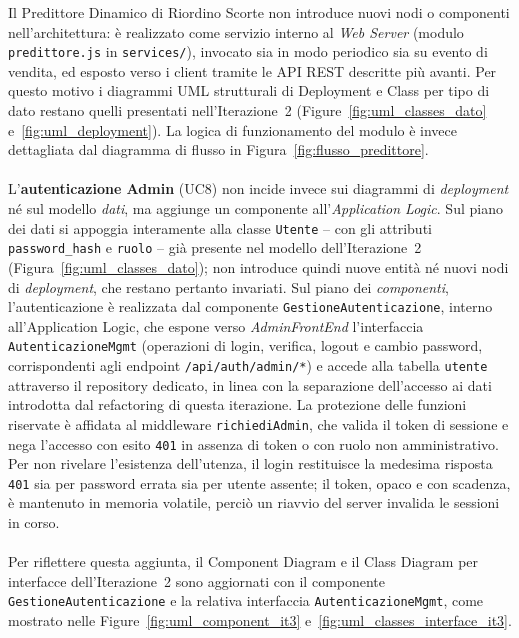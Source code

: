 Il Predittore Dinamico di Riordino Scorte non introduce nuovi nodi o componenti
nell'architettura: è realizzato come servizio interno al \textit{Web Server}
(modulo \texttt{predittore.js} in \texttt{services/}), invocato sia in modo
periodico sia su evento di vendita, ed esposto verso i client tramite le API REST
descritte più avanti. Per questo motivo i diagrammi UML strutturali di
Deployment e Class per tipo di dato restano quelli presentati nell'Iterazione~2
(Figure~\ref{fig:uml_classes_dato} e~\ref{fig:uml_deployment}). La logica di
funzionamento del modulo è invece dettagliata dal diagramma di flusso in
Figura~\ref{fig:flusso_predittore}.
\\ \\
L'\textbf{autenticazione Admin} (UC8) non incide invece sui diagrammi di
\emph{deployment} né sul modello \emph{dati}, ma aggiunge un componente
all'\textit{Application Logic}. Sul piano dei dati si appoggia interamente alla
classe \texttt{Utente} -- con gli attributi \texttt{password\_hash} e
\texttt{ruolo} -- già presente nel modello dell'Iterazione~2
(Figura~\ref{fig:uml_classes_dato}); non introduce quindi nuove entità né nuovi
nodi di \emph{deployment}, che restano pertanto invariati. Sul piano dei
\emph{componenti}, l'autenticazione è realizzata dal componente
\texttt{GestioneAutenticazione}, interno all'Application Logic, che espone verso
\textit{AdminFrontEnd} l'interfaccia \texttt{AutenticazioneMgmt} (operazioni di
login, verifica, logout e cambio password, corrispondenti agli endpoint
\texttt{/api/auth/admin/*}) e accede alla tabella \texttt{utente} attraverso il
repository dedicato, in linea con la separazione dell'accesso ai dati introdotta
dal refactoring di questa iterazione. La protezione delle funzioni riservate è
affidata al middleware \texttt{richiediAdmin}, che valida il token di sessione e
nega l'accesso con esito \texttt{401} in assenza di token o con ruolo non
amministrativo. Per non rivelare l'esistenza dell'utenza, il login restituisce la
medesima risposta \texttt{401} sia per password errata sia per utente assente; il
token, opaco e con scadenza, è mantenuto in memoria volatile, perciò un riavvio
del server invalida le sessioni in corso.
\\ \\
Per riflettere questa aggiunta, il Component Diagram e il Class Diagram per
interfacce dell'Iterazione~2 sono aggiornati con il componente
\texttt{GestioneAutenticazione} e la relativa interfaccia
\texttt{AutenticazioneMgmt}, come mostrato nelle
Figure~\ref{fig:uml_component_it3} e~\ref{fig:uml_classes_interface_it3}.

